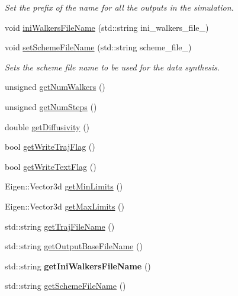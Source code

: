 \begin{DoxyCompactItemize}
\begin{DoxyCompactList}\small\item\em Set the prefix of the name for all the outputs in the simulation. \end{DoxyCompactList}\item 
void \hyperlink{class_parameters_a73d64bb093a93c2b806883f5504d8fb5}{ini\+Walkers\+File\+Name} (std\+::string ini\+\_\+walkers\+\_\+file\+\_\+)
\item 
void \hyperlink{class_parameters_a95ca6c28a5c87363460ca48eed5f065f}{set\+Scheme\+File\+Name} (std\+::string scheme\+\_\+file\+\_\+)
\begin{DoxyCompactList}\small\item\em Sets the scheme file name to be used for the data synthesis. \end{DoxyCompactList}\item 
unsigned \hyperlink{class_parameters_adb8599bc60f977f684f32a83bbe28fc1}{get\+Num\+Walkers} ()
\item 
unsigned \hyperlink{class_parameters_aa5aaf80e0189c63090e8f04cf485800f}{get\+Num\+Steps} ()
\item 
double \hyperlink{class_parameters_ac429071159941e3957eb7c030280a30f}{get\+Diffusivity} ()
\item 
bool \hyperlink{class_parameters_a21817e9a0207da2adf32611bcaf889ef}{get\+Write\+Traj\+Flag} ()
\item 
bool \hyperlink{class_parameters_adb6064f329732640c226608d6e1ddb60}{get\+Write\+Text\+Flag} ()
\item 
Eigen\+::\+Vector3d \hyperlink{class_parameters_abda8b91e5ac40e67c79184d7071c353a}{get\+Min\+Limits} ()
\item 
Eigen\+::\+Vector3d \hyperlink{class_parameters_ad4f8b826db4c1b665891740469e41086}{get\+Max\+Limits} ()
\item 
std\+::string \hyperlink{class_parameters_a38057c2ae3d11b578c8f199d73683ee1}{get\+Traj\+File\+Name} ()
\item 
std\+::string \hyperlink{class_parameters_a794fd941bf5ff311f61f2e6b4f19e64d}{get\+Output\+Base\+File\+Name} ()
\item 
\mbox{\label{class_parameters_af734dc58d8d5898049226614c2dd38a3}} 
std\+::string {\bfseries get\+Ini\+Walkers\+File\+Name} ()
\item 
std\+::string \hyperlink{class_parameters_a7291b970983c021569cd2e3a0573592c}{get\+Scheme\+File\+Name} ()
\end{DoxyCompactItemize}
